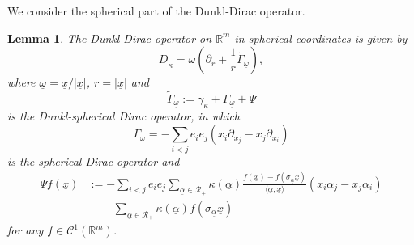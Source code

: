 \documentclass{amsart}
\newtheorem{lemma}[theorem]{Lemma}
\theoremstyle{definition}
\theoremstyle{remark}
\numberwithin{equation}{section}
\begin{document}
We consider the spherical part of the Dunkl-Dirac operator.
\begin{lemma} \label{fc1}\cite{fck} The Dunkl-Dirac operator on $\mathbb{R}^{m}$ in spherical coordinates is given by
\begin{equation*}
    \underline{D}_{\kappa}=\underline{\omega}\left(\partial_{r}+\frac{1}{r}\widetilde{\Gamma}_{\underline{\omega}}\right),
\end{equation*}
where $\underline{\omega}=\underline{x}/|\underline{x}|$, $r=|\underline{x}|$ and
\begin{equation}\label{ga1}
    \widetilde{\Gamma}_{\underline{\omega}}:=\gamma_{\kappa}+\Gamma_{\underline{\omega}}+\Psi
\end{equation}
is the Dunkl-spherical Dirac operator, in which %
\begin{equation*}
    \Gamma_{\underline{\omega}}=-\sum_{i<j}e_{i}e_{j}(x_{i}\partial_{x_{j}}-x_{j}\partial_{x_{i}})
\end{equation*} is the  spherical Dirac operator and
\begin{equation}\label{p21}
\begin{split}
     \Psi f(\underline{x})&:=-\sum_{i<j}e_{i}e_{j}\sum_{\underline{\alpha}\in \mathscr{R}_{+}}\kappa(\underline{\alpha})\frac{f(\underline{x})-f(\sigma_{\underline{\alpha}}\underline{x})}{\langle \underline{\alpha}, \underline{x}\rangle}(x_{i}\alpha_{j}-x_{j}\alpha_{i})\\
     &\quad -\sum_{\underline{\alpha}\in \mathscr{R}_{+}}\kappa(\underline{\alpha})f(\sigma_{\underline{\alpha}} \underline{x})
\end{split}
\end{equation}
for any $f\in \mathcal{C}^{1}(\mathbb{R}^{m})$.
\end{lemma}
\end{document}
